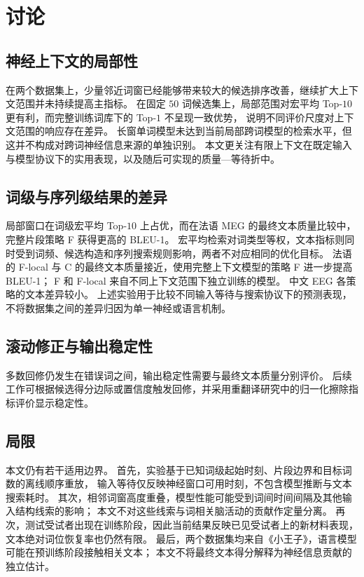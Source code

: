 \section{讨论}

\subsection{神经上下文的局部性}

在两个数据集上，少量邻近词窗已经能够带来较大的候选排序改善，继续扩大上下文范围并未持续提高主指标。
在固定 $50$ 词候选集上，局部范围对宏平均 Top-$10$ 更有利，而完整训练词库下的 Top-$1$ 不呈现一致优势，
说明不同评价尺度对上下文范围的响应存在差异。
长窗单词模型未达到当前局部跨词模型的检索水平，但这并不构成对跨词神经信息来源的单独识别。
本文更关注有限上下文在既定输入与模型协议下的实用表现，以及随后可实现的质量—等待折中。

\subsection{词级与序列级结果的差异}
\label{sec:discussion_word_sentence}

局部窗口在词级宏平均 Top-$10$ 上占优，而在法语 MEG 的最终文本质量比较中，完整片段策略 F 获得更高的 BLEU-1。
宏平均检索对词类型等权，文本指标则同时受到词频、候选构造和序列搜索规则影响，两者不对应相同的优化目标。
法语的 F-local 与 C 的最终文本质量接近，使用完整上下文模型的策略 F 进一步提高 BLEU-1；
F 和 F-local 来自不同上下文范围下独立训练的模型。
中文 EEG 各策略的文本差异较小。
上述实验用于比较不同输入等待与搜索协议下的预测表现，不将数据集之间的差异归因为单一神经或语言机制。

\subsection{滚动修正与输出稳定性}

多数回修仍发生在错误词之间，输出稳定性需要与最终文本质量分别评价。
后续工作可根据候选得分边际或置信度触发回修，并采用重翻译研究中的归一化擦除指标评价显示稳定性\cite{arivazhagan2020retranslation}。

\subsection{局限}

本文仍有若干适用边界。
首先，实验基于已知词级起始时刻、片段边界和目标词数的离线顺序重放，
输入等待仅反映神经窗口可用时刻，不包含模型推断与文本搜索耗时。
其次，相邻词窗高度重叠，模型性能可能受到词间时间间隔及其他输入结构线索的影响；
本文不对这些线索与词相关脑活动的贡献作定量分离。
再次，测试受试者出现在训练阶段，因此当前结果反映已见受试者上的新材料表现，文本绝对词位恢复率也仍然有限。
最后，两个数据集均来自《小王子》，语言模型可能在预训练阶段接触相关文本；
本文不将最终文本得分解释为神经信息贡献的独立估计。
